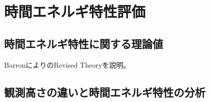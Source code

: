 \chapter{時間エネルギ特性評価}
\section{時間エネルギ特性に関する理論値}

BarronによりのRevised Theoryを説明。
\section{観測高さの違いと時間エネルギ特性の分析}

